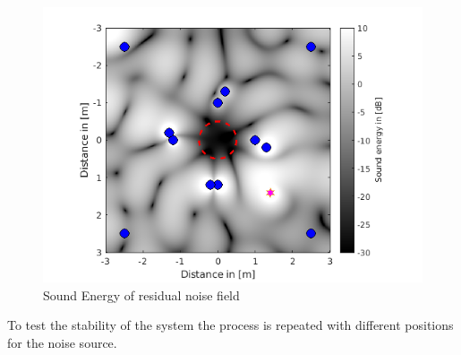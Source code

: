 \begin{figure}
    \centerline{\includegraphics[width=\textwidth]{LaTeX/images/plots/ANC_1png.png}}
    \caption{Sound Energy of residual noise field}
    \label{fig:ANC1}
\end{figure}

To test the stability of the system the process is repeated with different positions for the noise source.